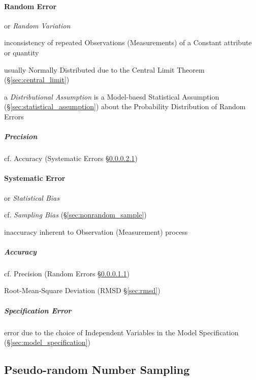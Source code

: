 \paragraph{Random Error}\label{sec:random_error}\hfill

or \emph{Random Variation}

inconsistency of repeated Observations (Measurements) of a Constant attribute or
quantity

usually Normally Distributed due to the Central Limit Theorem
(\S\ref{sec:central_limit})

\fist a \emph{Distributional Assumption} is a Model-baesd Statistical Assumption
(\S\ref{sec:statistical_assumption}) about the Probability Distribution of
Random Errors



\subparagraph{Precision}\label{sec:precision}\hfill

cf. Accuracy (Systematic Errors \S\ref{sec:accuracy})



\paragraph{Systematic Error}\label{sec:systematic_error}\hfill

or \emph{Statistical Bias}

cf. \emph{Sampling Bias} (\S\ref{sec:nonrandom_sample})

inaccuracy inherent to Observation (Measurement) process



\subparagraph{Accuracy}\label{sec:accuracy}\hfill

cf. Precision (Random Errors \S\ref{sec:precision})

\fist Root-Mean-Square Deviation (RMSD \S\ref{sec:rmsd})



\subparagraph{Specification Error}\label{sec:specification_error}\hfill


error due to the choice of Independent Variables in the Model Specification
(\S\ref{sec:model_specification})



\subsection{Pseudo-random Number Sampling}\label{sec:pseudorandom_sampling}

